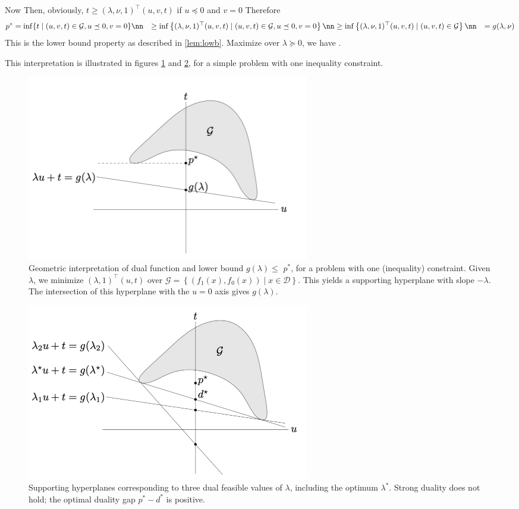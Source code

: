 \documentclass{article}
\begin{document}
Now  Then, obviously, $t \geq(\lambda, \nu, 1)^{\top}(u, v, t)$ if $u \preceq 0$ and $v=0$ Therefore
\begin{align}
p^*  &=\inf \{t \mid(u, v, t) \in \mathcal{G}, u \preceq 0, v=0\} \nn
& \geq \inf \left\{(\lambda, \nu, 1)^{\top}(u, v, t) \mid(u, v, t) \in \mathcal{G}, u \preceq 0, v=0\right\} \nn
& \geq \inf \left\{(\lambda, \nu, 1)^{\top}(u, v, t) \mid(u, v, t) \in \mathcal{G}\right\} \nn
&=g(\lambda, \nu)\label{eq:amzut}
\end{align}
This is the lower bound property as described in \cref{lem:lowb}. Maximize over $\lambda\succeq 0$, we have .


This interpretation is illustrated in figures \cref{fig:yozgherh} and  \cref{fig:yozgherh1}, for a simple problem with one inequality constraint.
\begin{figure}[H]
    \centering
    \includegraphics[width=0.6\textwidth]{Figs/9.png}
    \caption{Geometric interpretation of dual function and lower bound $g(\lambda) \leq$ $p^* $, for a problem with one (inequality) constraint. Given $\lambda$, we minimize $(\lambda, 1)^{\top}(u, t)$ over $\mathcal{G}=\left\{\left(f_{1}(x), f_{0}(x)\right) \mid x \in \mathcal{D}\right\}$. This yields a supporting hyperplane with slope $-\lambda$. The intersection of this hyperplane with the $u=0$ axis gives $g(\lambda)$.}
    \label{fig:yozgherh}
\end{figure}
\begin{figure}
    \centering
    \includegraphics[width=0.6\textwidth]{Figs/10.png}
    \caption{Supporting hyperplanes corresponding to three dual feasible values of $\lambda$, including the optimum $\lambda^*  .$ Strong duality does not hold; the optimal duality gap $p^* -d^* $ is positive.}
    \label{fig:yozgherh1}
\end{figure}
\end{document}
